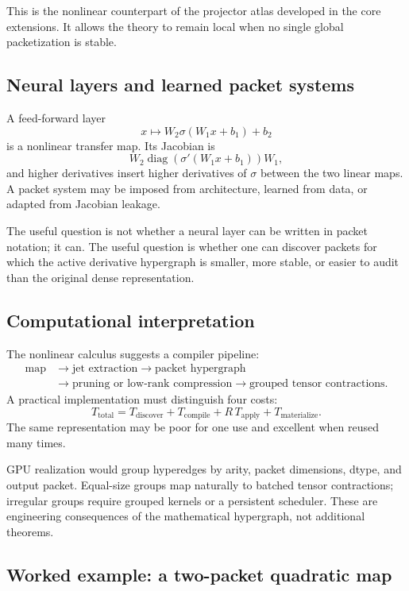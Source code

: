\documentclass[11pt]{article}
\theoremstyle{definition}
\theoremstyle{remark}
\begin{document}
This is the nonlinear counterpart of the projector atlas developed in the core extensions.  It allows the theory to remain local when no single global packetization is stable.


\subsection{Neural layers and learned packet systems}

A feed-forward layer
\[
x\longmapsto W_2\sigma(W_1x+b_1)+b_2
\]
is a nonlinear transfer map.  Its Jacobian is
\[
W_2\operatorname{diag}(\sigma'(W_1x+b_1))W_1,
\]
and higher derivatives insert higher derivatives of $\sigma$ between the two linear maps.  A packet system may be imposed from architecture, learned from data, or adapted from Jacobian leakage.

The useful question is not whether a neural layer can be written in packet notation; it can.  The useful question is whether one can discover packets for which the active derivative hypergraph is smaller, more stable, or easier to audit than the original dense representation.

\subsection{Computational interpretation}

The nonlinear calculus suggests a compiler pipeline:
\[
\begin{aligned}
\text{map}
&\longrightarrow
\text{jet extraction}
\longrightarrow
\text{packet hypergraph}\\
&\longrightarrow
\text{pruning or low-rank compression}
\longrightarrow
\text{grouped tensor contractions}.
\end{aligned}
\]
A practical implementation must distinguish four costs:
\[
T_{\mathrm{total}}
=
T_{\mathrm{discover}}
+
T_{\mathrm{compile}}
+
R\,T_{\mathrm{apply}}
+
T_{\mathrm{materialize}}.
\]
The same representation may be poor for one use and excellent when reused many times.

GPU realization would group hyperedges by arity, packet dimensions, dtype, and output packet.  Equal-size groups map naturally to batched tensor contractions; irregular groups require grouped kernels or a persistent scheduler.  These are engineering consequences of the mathematical hypergraph, not additional theorems.

\subsection{Worked example: a two-packet quadratic map}
\end{document}
